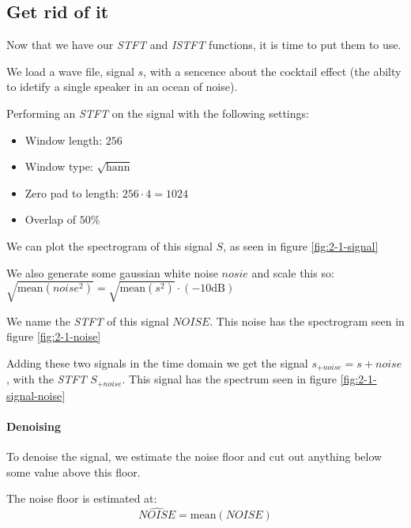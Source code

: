 \subsection{Get rid of it}
Now that we have our \emph{STFT} and \emph{ISTFT} functions, it is time to put
them to use.

We load a wave file, signal $s$, with a sencence about the cocktail effect (the
abilty to idetify a single speaker in an ocean of noise).

Performing an \emph{STFT} on the signal with the following settings:
\begin{itemize}
  \item Window length: $256$
  \item Window type: $\sqrt{\mbox{hann}}$
  \item Zero pad to length: $256 \cdot 4 = 1024$
  \item Overlap of $50\%$
\end{itemize}

We can plot the spectrogram of this signal $S$, as seen in figure
\ref{fig:2-1-signal}

We also generate some gaussian white noise $nosie$ and scale this so:
$\sqrt{ \mbox{mean}( noise^2 ) } = \sqrt{ \mbox{mean}( s^2 ) } \cdot (-10
\mbox{dB})$

We name the \emph{STFT} of this signal $NOISE$.
This noise has the spectrogram seen in figure \ref{fig:2-1-noise}

Adding these two signals in the time domain we get the signal $s_{+noise} = s
+ noise$, with the \emph{STFT} $S_{+noise}$. This signal has the spectrum seen
in figure \ref{fig:2-1-signal-noise}

\paragraph{Denoising}
To denoise the signal, we estimate the noise floor and cut out anything below
some value above this floor.

The noise floor is estimated at:
\begin{equation*}
\widehat{NOISE} = \mbox{mean}(NOISE)
\end{equation*}

